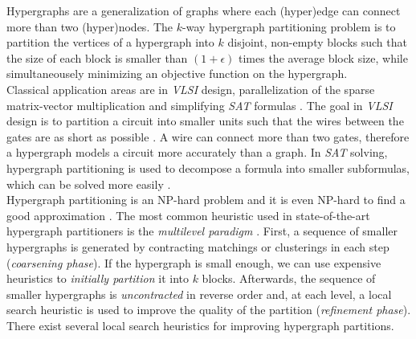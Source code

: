Hypergraphs are a generalization of graphs where each (hyper)edge can connect 
more than two (hyper)nodes. The $k$-way hypergraph partitioning problem is to 
partition the vertices of a hypergraph into $k$ disjoint, non-empty blocks such
that the size of each block is smaller than $(1+\epsilon)$ times the
average block size, while simultaneousely minimizing an objective function on the hypergraph. \\
Classical application areas are in \emph{VLSI} design, parallelization of
the sparse matrix-vector multiplication and simplifying \emph{SAT} formulas 
\cite{karypis1999multilevel, mann2014formula, papa2007hypergraph}. The goal 
in \emph{VLSI} design is to partition a circuit into smaller units such that
the wires between the gates are as short as possible \cite{bulucc2016recent}.
A wire can connect more than two gates, therefore a hypergraph models a circuit more
accurately than a graph. In \emph{SAT} solving, hypergraph partitioning is used to
decompose a formula into smaller subformulas, which can be solved more easily \cite{mann2014formula}.\\
Hypergraph partitioning is an NP-hard problem \cite{lengauer2012combinatorial} and
it is even NP-hard to find a good approximation \cite{bui1992finding}.
The most common heuristic used in state-of-the-art hypergraph partitioners is the
\emph{multilevel paradigm} \cite{catalyurek1999hypergraph, heuer2017improving, karypis1999multilevel}.
First, a sequence of smaller hypergraphs is generated by contracting matchings
or clusterings in each step (\emph{coarsening phase}). If the hypergraph is small enough, we can use expensive
heuristics to \emph{initially partition} it into $k$ blocks. Afterwards, the sequence
of smaller hypergraphs is \emph{uncontracted} in reverse order and, at each level, a 
local search heuristic is used to improve the quality of the partition 
(\emph{refinement phase}). \\
There exist several local search heuristics for improving hypergraph partitions.
